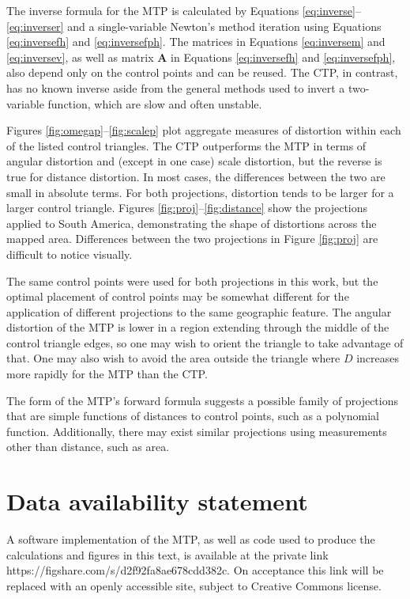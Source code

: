 \documentclass[]{interact}
\begin{document}
The inverse formula for the MTP is calculated by Equations
\ref{eq:inverse}--\ref{eq:inverser} and a single-variable Newton's method
iteration using Equations \ref{eq:inversefh} and \ref{eq:inversefph}. The
matrices in Equations \ref{eq:inversem} and \ref{eq:inversev}, as well
as matrix $\mathbf A$ in Equations \ref{eq:inversefh} and \ref{eq:inversefph},
also depend only on the control points and can be reused. The CTP,
in contrast, has no known inverse aside from the general methods used to invert
a two-variable function, which are slow and often unstable.

Figures \ref{fig:omegap}--\ref{fig:scalep} plot aggregate measures of distortion
within each of the listed control triangles. The CTP outperforms the MTP in
terms of angular distortion and (except in one case) scale distortion, but the
reverse is true for distance distortion. In most cases, the differences between
the two are small in absolute terms. For both projections, distortion tends to
be larger for a larger control triangle.
Figures \ref{fig:proj}--\ref{fig:distance} show the projections applied to
South America, demonstrating the shape of distortions across the mapped area.
Differences between the two projections in Figure \ref{fig:proj}
are difficult to notice visually.

The same control points were used for both projections in this work, but the
optimal placement of control points may be somewhat different for the
application of different projections to the same geographic feature. The
angular distortion of the MTP is lower in a region extending through the middle
of the control triangle edges, so one may wish to orient the triangle to take
advantage of that. One may also wish to avoid the area outside the triangle
where $D$ increases more rapidly for the MTP than the CTP.

The form of the MTP's forward formula suggests a possible family of projections
that are simple functions of distances to control points, such as a polynomial
function. Additionally, there may exist similar projections using measurements
other than distance, such as area.

\section{Data availability statement}
A software implementation of the MTP, as well as code used to
produce the calculations and figures in this text,
is available at the private link https://figshare.com/s/d2f92fa8ae678cdd382c.
On acceptance this link will be replaced with an openly accessible site,
subject to Creative Commons license.
\end{document}
